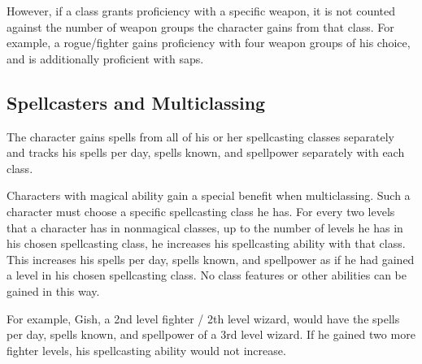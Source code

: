However, if a class grants proficiency with a specific weapon, it is not counted against the number of weapon groups the character gains from that class.
For example, a rogue/fighter gains proficiency with four weapon groups of his choice, and is additionally proficient with saps.

\subsection{Spellcasters and Multiclassing}\label{Spellcasters and Multiclassing}
The character gains spells from all of his or her spellcasting classes separately and tracks his spells per day, spells known, and spellpower separately with each class.

Characters with magical ability gain a special benefit when multiclassing.
Such a character must choose a specific spellcasting class he has.
For every two levels that a character has in nonmagical classes, up to the number of levels he has in his chosen spellcasting class, he increases his spellcasting ability with that class.
This increases his spells per day, spells known, and spellpower as if he had gained a level in his chosen spellcasting class.
No class features or other abilities can be gained in this way.


For example, Gish, a 2nd level fighter / 2th level wizard, would have the spells per day, spells known, and spellpower of a 3rd level wizard.
If he gained two more fighter levels, his spellcasting ability would not increase.
